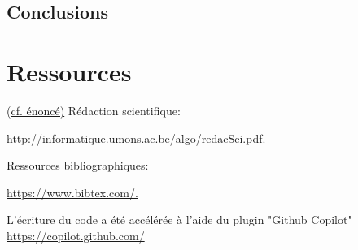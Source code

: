 \documentclass{article}
\begin{document}




    \newpage

    \subsection{Conclusions }



    \newpage



    \section{Ressources}
    \underline{(cf. énoncé)}
    Rédaction scientifique:

    \href{http://informatique.umons.ac.be/algo/redacSci.pdf.}{http://informatique.umons.ac.be/algo/redacSci.pdf.
    }

    Ressources bibliographiques:

    \href{https://www.bibtex.com/.}{https://www.bibtex.com/.}

    L'écriture du code a été accélérée à l'aide du plugin "Github Copilot"
    \href{https://copilot.github.com/}{https://copilot.github.com/}
\end{document}
